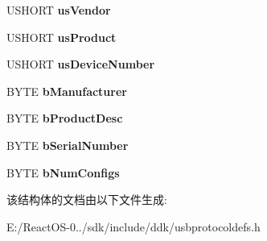 \begin{DoxyCompactItemize}
U\+S\+H\+O\+RT {\bfseries us\+Vendor}
\item 
\mbox{\label{struct___u_s_b_d_e_v_i_c_e_d_e_s_c_aaf86de5b8f48553ae626c7349aab39a3}} 
U\+S\+H\+O\+RT {\bfseries us\+Product}
\item 
\mbox{\label{struct___u_s_b_d_e_v_i_c_e_d_e_s_c_adcf8e7e1c6b1e3075e90bb4a18118b4d}} 
U\+S\+H\+O\+RT {\bfseries us\+Device\+Number}
\item 
\mbox{\label{struct___u_s_b_d_e_v_i_c_e_d_e_s_c_a8d2d0c2c964411c58a79402f4799e1da}} 
B\+Y\+TE {\bfseries b\+Manufacturer}
\item 
\mbox{\label{struct___u_s_b_d_e_v_i_c_e_d_e_s_c_a0d9301f8dd782b705cef01d8521a5c9a}} 
B\+Y\+TE {\bfseries b\+Product\+Desc}
\item 
\mbox{\label{struct___u_s_b_d_e_v_i_c_e_d_e_s_c_a2ad89cb04276b117e59bcfc3022df567}} 
B\+Y\+TE {\bfseries b\+Serial\+Number}
\item 
\mbox{\label{struct___u_s_b_d_e_v_i_c_e_d_e_s_c_a1feee5c4bca2a8ba29f09a788d7a23bf}} 
B\+Y\+TE {\bfseries b\+Num\+Configs}
\end{DoxyCompactItemize}


该结构体的文档由以下文件生成\+:\begin{DoxyCompactItemize}
\item 
E\+:/\+React\+O\+S-\/0../sdk/include/ddk/usbprotocoldefs.\+h\end{DoxyCompactItemize}
